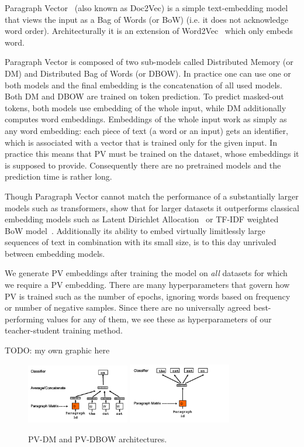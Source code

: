 Paragraph Vector~\cite{le2014distributed} (also known as Doc2Vec) is a simple
text-embedding model that views the input as a Bag of Words (or BoW) (i.e. it
does not acknowledge word order). Architecturally it is an extension of
Word2Vec~\cite{mikolov2013efficient} which only embeds word.

Paragraph Vector is composed of two sub-models called Distributed Memory (or DM)
and Distributed Bag of Words (or DBOW). In practice one can use one or both
models and the final embedding is the concatenation of all used models. Both DM
and DBOW are trained on token prediction. To predict masked-out tokens, both
models use embedding of the whole input, while DM additionally computes word
embeddings. Embeddings of the whole input work as simply as any word embedding:
each piece of text (a word or an input) gets an identifier, which is associated
with a vector that is trained only for the given input. In practice this means
that PV must be trained on the dataset, whose embeddings it is supposed to
provide. Consequently there are no pretrained models and the prediction time is
rather long.

Though Paragraph Vector cannot match the performance of a substantially larger
models such as transformers, \cite{dai2015document} show that for larger
datasets it outperforms classical embedding models such as Latent Dirichlet
Allocation~\cite{blei2003latent} or TF-IDF weighted BoW
model~\cite{harris1954distributional}. Additionally its ability to embed
virtually limitlessly large sequences of text in combination with its small
size, is to this day unrivaled between embedding models.

We generate PV embeddings after training the model on \emph{all} datasets for
which we require a PV embedding. There are many hyperparameters that govern how
PV is trained such as the number of epochs, ignoring words based on frequency or
number of negative samples. Since there are no universally agreed
best-performing values for any of them, we see these as hyperparameters of our
teacher-student training method.

TODO: my own graphic here

\begin{figure}[h]
    \centering
    \includegraphics[width=0.4\textwidth]{./img/pv-dm.png}
    \includegraphics[width=0.4\textwidth]{./img/pv-dbow.png}
    \caption{PV-DM and PV-DBOW architectures.\label{fig:pv-dm_pv-dbow}}
\end{figure}

